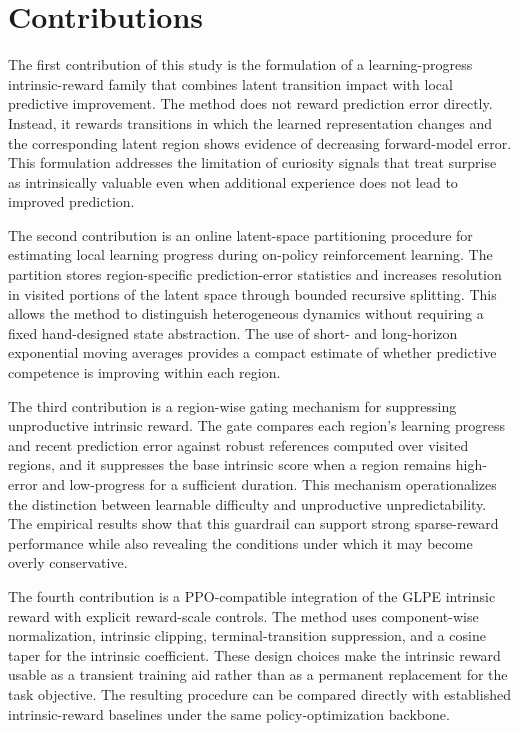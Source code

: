 \section{Contributions}
\label{sec:conclusion_contributions}

The first contribution of this study is the formulation of a learning-progress intrinsic-reward family that combines latent transition impact with local predictive improvement.
The method does not reward prediction error directly.
Instead, it rewards transitions in which the learned representation changes and the corresponding latent region shows evidence of decreasing forward-model error.
This formulation addresses the limitation of curiosity signals that treat surprise as intrinsically valuable even when additional experience does not lead to improved prediction.

The second contribution is an online latent-space partitioning procedure for estimating local learning progress during on-policy reinforcement learning.
The partition stores region-specific prediction-error statistics and increases resolution in visited portions of the latent space through bounded recursive splitting.
This allows the method to distinguish heterogeneous dynamics without requiring a fixed hand-designed state abstraction.
The use of short- and long-horizon exponential moving averages provides a compact estimate of whether predictive competence is improving within each region.

The third contribution is a region-wise gating mechanism for suppressing unproductive intrinsic reward.
The gate compares each region's learning progress and recent prediction error against robust references computed over visited regions, and it suppresses the base intrinsic score when a region remains high-error and low-progress for a sufficient duration.
This mechanism operationalizes the distinction between learnable difficulty and unproductive unpredictability.
The empirical results show that this guardrail can support strong sparse-reward performance while also revealing the conditions under which it may become overly conservative.

The fourth contribution is a PPO-compatible integration of the GLPE intrinsic reward with explicit reward-scale controls.
The method uses component-wise normalization, intrinsic clipping, terminal-transition suppression, and a cosine taper for the intrinsic coefficient.
These design choices make the intrinsic reward usable as a transient training aid rather than as a permanent replacement for the task objective.
The resulting procedure can be compared directly with established intrinsic-reward baselines under the same policy-optimization backbone.

